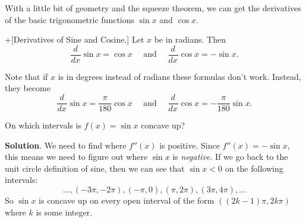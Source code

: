 \documentclass[10pt,]{book}
\theoremstyle{ptxplainnotitle}
\theoremstyle{ptxplaintitle}
\theoremstyle{ptxplainnotitle}
\theoremstyle{ptxplaintitle}
\theoremstyle{ptxplainnotitle}
\theoremstyle{ptxplaintitle}
\theoremstyle{ptxdefinitionnotitle}
\theoremstyle{ptxdefinitiontitle}
\theoremstyle{ptxdefinitionnotitle}
\theoremstyle{ptxdefinitiontitle}
\theoremstyle{ptxdefinitionnotitle}
\theoremstyle{ptxdefinitiontitle}
\theoremstyle{ptxdefinitionnotitle}
\theoremstyle{ptxdefinitiontitle}
\theoremstyle{ptxdefinitionnotitle}
\theoremstyle{ptxdefinitiontitle}
\numberwithin{equation}{section}
\newcommand{\dv}[3][]{\dfrac{d^{#1} #2}{d #3^{#1}}}
\begin{document}
\hypertarget{p-129}{}%
With a little bit of geometry and the squeeze theorem, we can get the derivatives of the basic trigonometric functions \(\sin x\) and \(\cos x\).%
\begin{theorem}+[{Derivatives of Sine and Cosine.}]\label{theorem-derivatives-of-sine-and-cosine}
\hypertarget{p-130}{}%
Let \(x\) be in radians. Then%
\begin{equation*}
\dv{}{x}\sin x = \cos x\quad\text{ and }\quad\dv{}{x}\cos x = -\sin x.
\end{equation*}
%
\end{theorem}
\hypertarget{p-131}{}%
Note that if \(x\) is in degrees instead of radians these formulas don't work. Instead, they become%
\begin{equation*}
\dv{}{x}\sin x = \frac{\pi}{180}\cos x\quad\text{ and }\quad\dv{}{x}\cos x = -\frac{\pi}{180}\sin x.
\end{equation*}
%
\begin{example}\label{example-concavity-of-the-sine-function}
\hypertarget{p-132}{}%
On which intervals is \(f(x) = \sin x\) concave up?%
\par\smallskip%
\noindent\textbf{Solution}.\hypertarget{solution-27}{}\quad%
\hypertarget{p-133}{}%
We need to find where \(f''(x)\) is positive. Since \(f''(x) = -\sin x\), this means we need to figure out where \(\sin x\) is \emph{negative}. If we go back to the unit circle definition of sine, then we can see that \(\sin x < 0\) on the following intervals:%
\begin{equation*}
\ldots, (-3\pi,-2\pi), (-\pi,0),(\pi,2\pi), (3\pi,4\pi),\ldots
\end{equation*}
So \(\sin x\) is concave up on every open interval of the form \(((2k-1)\pi, 2k\pi)\) where \(k\) is some integer.%
\end{example}
\typeout{************************************************}
\typeout{************************************************}
\end{document}
